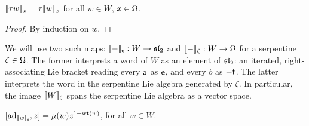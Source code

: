 \begin{lem}\label{lem:bkt-invol}
$\bkt{\tau w}_x = \tau\bkt{w}_x$ for all $w\in W$, $x\in\Om$.
\end{lem}
\begin{proof}
        By induction on $w$.
\end{proof}

We will use two such maps: $\bkt{-}_\e : W \to \sl_2$ and $\bkt{-}_\zeta : W \to \Om$ 
for a serpentine $\zeta\in\Om$. 
The former interprets a word of $W$ as an element of $\sl_2$: an iterated, right-associating
Lie bracket reading every $\a$ as $\e$, and every $b$ as $-\f$. The latter interprets the word in
the serpentine Lie algebra generated by $\zeta$. In particular, the image $\bkt{W}_\zeta$ spans the 
serpentine Lie algebra as a vector space.

\begin{lem}\label{lem:mu} $[ \ad_{\bkt{w}_\e}, z ] = \mu(w) z^{1 + \wt(w)}$, for all $w \in W$. \end{lem}

